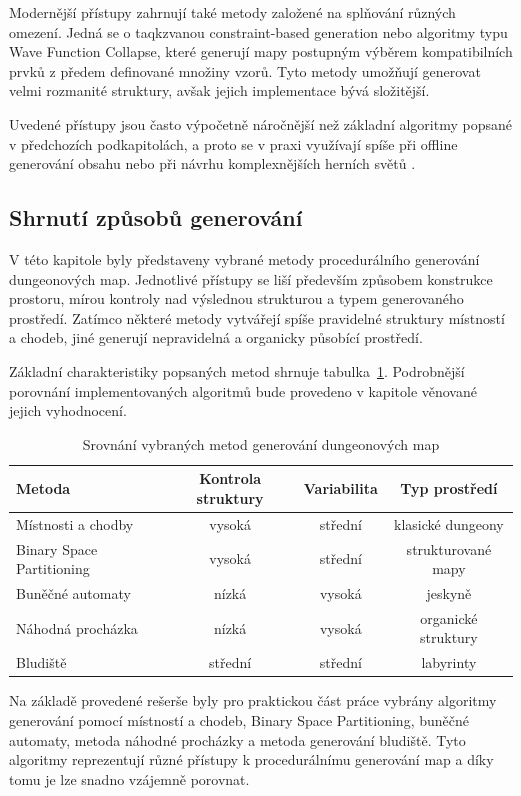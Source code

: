 \documentclass[
  program=itk,
  biblatex,
  figures=false,
  glossaries,
  index
]{kidiplom}
\begin{document}
Modernější přístupy zahrnují také metody založené na splňování různých omezení. Jedná se o taqkzvanou constraint-based generation nebo algoritmy typu Wave Function Collapse, které generují mapy postupným výběrem kompatibilních prvků z předem definované množiny vzorů. 
Tyto metody umožňují generovat velmi rozmanité struktury, avšak jejich implementace bývá složitější.

Uvedené přístupy jsou často výpočetně náročnější než základní algoritmy popsané v předchozích podkapitolách, a proto se v praxi využívají spíše při offline generování obsahu nebo při návrhu komplexnějších herních světů \cite{Linden2014,Shaker2016}.
\subsection{Shrnutí způsobů generování}

V této kapitole byly představeny vybrané metody procedurálního generování dungeonových map.
Jednotlivé přístupy se liší především způsobem konstrukce prostoru, mírou kontroly nad výslednou strukturou a typem generovaného prostředí.
Zatímco některé metody vytvářejí spíše pravidelné struktury místností a chodeb, jiné generují nepravidelná a organicky působící prostředí.

Základní charakteristiky popsaných metod shrnuje tabulka~\ref{tab:dungeon_methods}.
Podrobnější porovnání implementovaných algoritmů bude provedeno v kapitole věnované jejich vyhodnocení.

\begin{table}[h]
\centering
\begin{tabular}{|l|c|c|c|}
\hline
Metoda & Kontrola struktury & Variabilita & Typ prostředí \\ 
\hline
Místnosti a chodby & vysoká & střední & klasické dungeony \\
Binary Space Partitioning & vysoká & střední & strukturované mapy \\
Buněčné automaty & nízká & vysoká & jeskyně \\
Náhodná procházka & nízká & vysoká & organické struktury \\
Bludiště & střední & střední & labyrinty \\
\hline
\end{tabular}
\caption{Srovnání vybraných metod generování dungeonových map}
\label{tab:dungeon_methods}
\end{table}

Na základě provedené rešerše byly pro praktickou část práce vybrány algoritmy generování pomocí místností a chodeb, Binary Space Partitioning, buněčné automaty, metoda náhodné procházky a metoda generování bludiště. Tyto algoritmy reprezentují různé přístupy k procedurálnímu generování map a díky tomu je lze snadno vzájemně porovnat.
\end{document}
